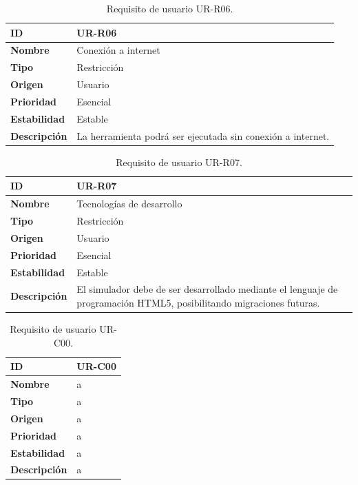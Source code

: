 \begin{center}
\begin{table}[htbp]
\centering
\begin{tabular}{@{}p{2.5cm} p{9cm}@{}} 
\toprule
\textbf{ID} 				& UR-R06 \\
\midrule
\textbf{Nombre} 			& Conexión a internet \\
\midrule
\textbf{Tipo} 			& Restricción \\
\midrule
\textbf{Origen} 			& Usuario \\
\midrule
\textbf{Prioridad}		& Esencial \\
\midrule
\textbf{Estabilidad} 		& Estable \\
\midrule
\textbf{Descripción} 	& La herramienta podrá ser ejecutada sin conexión a internet. \\
\bottomrule
\end{tabular}
\caption{Requisito de usuario UR-R06.}
\label{tab:urr06}
\end{table}
\end{center}

\begin{center}
\begin{table}[htbp]
\centering
\begin{tabular}{@{}p{2.5cm} p{9cm}@{}} 
\toprule
\textbf{ID} 				& UR-R07 \\
\midrule
\textbf{Nombre} 			& Tecnologías de desarrollo \\
\midrule
\textbf{Tipo} 			& Restricción \\
\midrule
\textbf{Origen} 			& Usuario \\
\midrule
\textbf{Prioridad}		& Esencial \\
\midrule
\textbf{Estabilidad} 		& Estable \\
\midrule
\textbf{Descripción} 	& El simulador debe de ser desarrollado mediante el lenguaje de programación HTML5, posibilitando migraciones futuras. \\
\bottomrule
\end{tabular}
\caption{Requisito de usuario UR-R07.}
\label{tab:urr07}
\end{table}
\end{center}

\iffalse

\begin{center}
\begin{table}[htbp]
\centering
\begin{tabular}{@{}p{2.5cm} p{9cm}@{}} 
\toprule
\textbf{ID} 				& UR-C00 \\
\midrule
\textbf{Nombre} 			& a \\
\midrule
\textbf{Tipo} 			& a \\
\midrule
\textbf{Origen} 			& a \\
\midrule
\textbf{Prioridad}		& a \\
\midrule
\textbf{Estabilidad} 		& a \\
\midrule
\textbf{Descripción} 	& a \\
\bottomrule
\end{tabular}
\caption{Requisito de usuario UR-C00.}
\label{tab:urc00}
\end{table}
\end{center}

